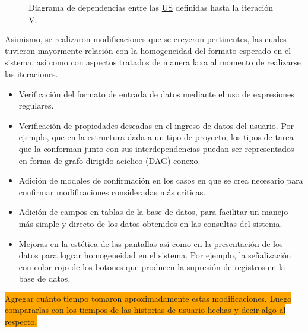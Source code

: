 \documentclass[a4paper, 12pt,twoside]{report}  %
\numberwithin{equation}{subsection} %
\begin{document}
\begin{figure}[h]
\begin{center}
{
		}
		\caption{Diagrama de dependencias entre las \protect\hyperlink{US}{US} definidas hasta la iteración V.}
		\label{diagrama_dependencias_US_final}
	\end{center}
\end{figure}

Asimismo, se realizaron modificaciones que se creyeron pertinentes, las cuales tuvieron mayormente relación con la homogeneidad del formato esperado en el sistema, así como con aspectos tratados de manera laxa al momento de realizarse las iteraciones.
\begin{itemize}
	\item Verificación del formato de entrada de datos mediante el uso de expresiones regulares.
	\item Verificación de propiedades deseadas en el ingreso de datos del usuario. Por ejemplo, que en la estructura dada a un tipo de proyecto, los tipos de tarea que la conforman junto con sus interdependencias puedan ser representados en forma de grafo dirigido acíclico (DAG) conexo.
	\item Adición de modales de confirmación en los casos en que se crea necesario para confirmar modificaciones consideradas más críticas.
	\item Adición de campos en tablas de la base de datos, para facilitar un manejo más simple y directo de los datos obtenidos en las consultas del sistema.
	\item Mejoras en la estética de las pantallas así como en la presentación de los datos para lograr homogeneidad en el sistema. Por ejemplo, la señalización con color rojo de los botones que producen la supresión de registros en la base de datos.
\end{itemize}
\colorbox{orange}{Agregar cuánto tiempo tomaron aproximadamente estas modificaciones. Luego compararlas con los tiempos de las historias de usuario hechas y decir algo al respecto.}
\end{document}
